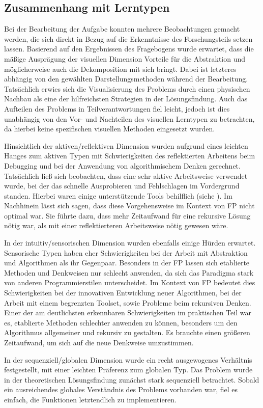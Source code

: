 \subsection{Zusammenhang mit Lerntypen}
Bei der Bearbeitung der Aufgabe konnten mehrere Beobachtungen gemacht werden, die sich direkt in Bezug auf die Erkenntnisse des Forschungsteils setzen lassen. Basierend auf den Ergebnissen des Fragebogens wurde erwartet, dass die mäßige Ausprägung der visuellen Dimension Vorteile für die Abstraktion und möglicherweise auch die Dekomposition mit sich bringt. Dabei ist letzteres abhängig von den gewählten Darstellungsmethoden während der Bearbeitung.
Tatsächlich erwies sich die Visualisierung des Problems durch einen physischen Nachbau als eine der hilfreichsten Strategien in der Lösungsfindung.
Auch das Aufteilen des Problems in Teilverantwortungen fiel leicht, jedoch ist dies unabhängig von den Vor- und Nachteilen des visuellen Lerntypen zu betrachten, da hierbei keine spezifischen visuellen Methoden eingesetzt wurden.

Hinsichtlich der aktiven/reflektiven Dimension wurden aufgrund eines leichten Hanges zum aktiven Typen mit Schwierigkeiten des reflektierten Arbeitens beim Debugging und bei der Anwendung von algorithmischem Denken gerechnet. Tatsächlich ließ sich beobachten, dass eine sehr aktive Arbeitsweise verwendet wurde, bei der das schnelle Ausprobieren und Fehlschlagen im Vordergrund standen. Hierbei waren einige unterstützende Tools behilflich (siehe ).
Im Nachhinein lässt sich sagen, dass diese Vorgehensweise im Kontext von FP nicht optimal war. Sie führte dazu, dass mehr Zeitaufwand für eine rekursive Lösung nötig war, als mit einer reflektierteren Arbeitsweise nötig gewesen wäre.

In der intuitiv/sensorischen Dimension wurden ebenfalls einige Hürden erwartet. Sensorische Typen haben eher Schwierigkeiten bei der Arbeit mit Abstraktion und Algorithmen als ihr Gegenpaar. Besonders in der FP lassen sich etablierte Methoden und Denkweisen nur schlecht anwenden, da sich das Paradigma stark von anderen Programmierstilen unterscheidet.
Im Kontext von FP bedeutet dies Schwierigkeiten bei der innovativen Entwicklung neuer Algorithmen, bei der Arbeit mit einem begrenzten Toolset, sowie Probleme beim rekursiven Denken.
Einer der am deutlichsten erkennbaren Schwierigkeiten im praktischen Teil war es, etablierte Methoden schlechter anwenden zu können, besonders um den Algorithmus allgemeiner und rekursiv zu gestalten. Es brauchte einen größeren Zeitaufwand, um sich auf die neue Denkweise umzustimmen.

In der sequenziell/globalen Dimension wurde ein recht ausgewogenes Verhältnis festgestellt, mit einer leichten Präferenz zum globalen Typ. Das Problem wurde in der theoretischen Lösungsfindung zunächst stark sequenziell betrachtet. Sobald ein ausreichendes globales Verständnis des Problems vorhanden war, fiel es einfach, die Funktionen letztendlich zu implementieren.
